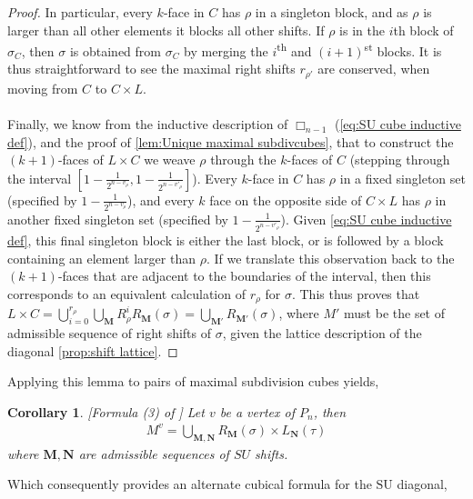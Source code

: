 \documentclass{amsart}
\newtheorem{corollary}[theorem]{Corollary}
\theoremstyle{definition}
\newcommand{\ordinal}{\textsuperscript{th}} %
\newcommand{\ordinalst}{\textsuperscript{st}} %
\newcommand{\SU}{\mathrm{SU}}
\newcommand{\divcube}[1]{\Box_{#1}}
\newcommand{\maxsubdivpairsv}{M^v}
\begin{document}
\begin{proof}
In particular, every $k$-face in $C$ has $\rho$ in a singleton block, and as $\rho$ is larger than all other elements it blocks all other shifts.
If $\rho$ is in the $i$th block of $\sigma_C$, then $\sigma$ is obtained from $\sigma_C$ by merging the $i$\ordinal{} and $(i+1)$\ordinalst{} blocks.
It is thus straightforward to see the maximal right shifts $r_{\rho'}$ are conserved, when moving from $C$ to $C\times L$.
\\\\
Finally, we know from the inductive description of $\divcube{n-1}$ (\cref{eq:SU cube inductive def}), and the proof of \cref{lem:Unique maximal subdivcubes}, that to construct the $(k+1)$-faces of $L\times C$ we weave $\rho$ through the $k$-faces of $C$ (stepping through the interval $[1-\frac{1}{2^{n-v_\rho}},1-\frac{1}{2^{n-v'_\rho}}]$).
Every $k$-face in $C$ has $\rho$ in a fixed singleton set (specified by $1-\frac{1}{2^{n-v_\rho}}$), and every $k$ face on the opposite side of $C\times L$ has $\rho$ in another fixed singleton set (specified by $1-\frac{1}{2^{n-v'_\rho}}$).
Given \cref{eq:SU cube inductive def}, this final singleton block is either the last block, or is followed by a block containing an element larger than $\rho$.
If we translate this observation back to the $(k+1)$-faces that are adjacent to the boundaries of the interval, then this corresponds to an equivalent calculation of $r_\rho$ for $\sigma$.
This thus proves that $L\times C = \bigcup_{i=0}^{r_\rho}\bigcup_{\mathbf{M}}R^i_\rho R_\mathbf{M}(\sigma) = \bigcup_{\mathbf{M'}}R_\mathbf{M'}(\sigma)$, where $M'$ must be the set of admissible sequence of right shifts of $\sigma$, given the lattice description of the diagonal \cref{prop:shift lattice}.

\end{proof}

Applying this lemma to pairs of maximal subdivision cubes yields,

\begin{corollary}\label{prop:Maximal Subdiv Pairs and Shifts}
[Formula (3) of \cite{SaneblidzeUmble-comparingDiagonals}]
Let $v$ be a vertex of $P_n$, then
\begin{align*}
	\maxsubdivpairsv = \bigcup_{\mathbf{M},\mathbf{N}} R_\mathbf{M}(\sigma) \times L_{\mathbf{N}}(\tau)
\end{align*}
where $\mathbf{M},\mathbf{N}$ are admissible sequences of $SU$ shifts.
\end{corollary}

Which consequently provides an alternate cubical formula for the $\SU$ diagonal,
\end{document}
